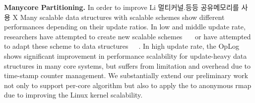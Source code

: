 \else

\fi

\ifkor
\noindent
\textbf{Manycore Partitioning.}
In order to improve Li
멀티커널.등등 공유메모리를 사용 X
Many scalable data structures with scalable schemes show
different performances depending on their update ratios.
In low and middle update rate, researchers have attempted to create new scalable
schemes~\cite{McKenney98}~\cite{Matveev2015RLU}~\cite{Harris2001Lockfree}
or have attempted to adapt these scheme to data structures~\cite{Arbel2014ConcurrentRCU}~\cite{Dodds2015SCT}~\cite{AustinTClements2012RCUBalancedTrees}.
In high update rate, the OpLog shows significant improvement in
performance scalability for update-heavy data structures in
many core systems, but suffers from limitation and overhead due
to time-stamp counter management.
We substantially extend our preliminary work~\cite{Kyong2016LDU} not only to support 
per-core algorithm but also to apply the  to anonymous rmap due to improving the
Linux kernel scalability.
\else

\fi


